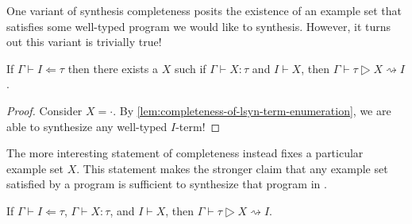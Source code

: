 One variant of synthesis completeness posits the existence of an example set that satisfies some well-typed program we would like to synthesis.
However, it turns out this variant is trivially true!
\begin{lemma}
If $Γ ⊢ I ⇐ τ$ then there exists a $Χ$ such if $Γ ⊢ Χ : τ$ and $I ⊢ Χ$, then $Γ ⊢ τ ▷ Χ ⇝ I$.
\end{lemma}
\begin{proof}
  Consider $Χ = ·$.
  By \autoref{lem:completeness-of-lsyn-term-enumeration}, we are able to synthesize any well-typed $I$-term!
\end{proof}

The more interesting statement of completeness instead fixes a particular example set $Χ$.
This statement makes the stronger claim that any example set satisfied by a program is sufficient to synthesize that program in \lsyn{}.
\begin{lemma}
If $Γ ⊢ I ⇐ τ$, $Γ ⊢ Χ : τ$, and $I ⊢ Χ$, then $Γ ⊢ τ ▷ Χ ⇝ I$.
\end{lemma}

